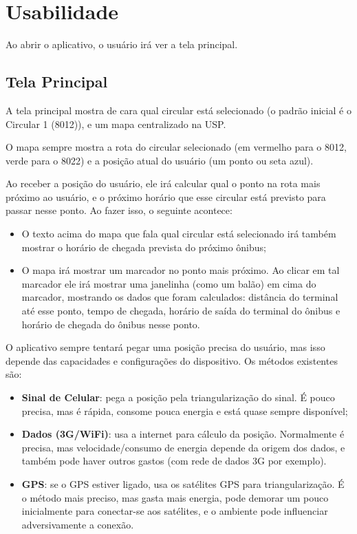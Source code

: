 




\cabecalho

\section{Usabilidade}
Ao abrir o aplicativo, o usuário irá ver a tela principal. 

\subsection{Tela Principal}
A tela principal mostra de cara qual circular está selecionado (o padrão inicial é o Circular 1 (8012)),
e um mapa centralizado na USP.

O mapa sempre mostra a rota do circular selecionado (em vermelho para o 8012, verde para o 8022) e a posição
atual do usuário (um ponto ou seta azul).

Ao receber a posição do usuário, ele irá calcular qual o ponto na rota mais próximo ao usuário, e o próximo horário
que esse circular está previsto para passar nesse ponto. Ao fazer isso, o seguinte acontece:
\begin{itemize}
    \item O texto acima do mapa que fala qual circular está selecionado
        irá também mostrar o horário de chegada prevista do próximo ônibus;
    \item O mapa irá mostrar um marcador no ponto mais próximo. Ao clicar em tal marcador ele irá mostrar
        uma janelinha (como um balão) em cima do marcador, mostrando os dados que foram calculados: distância
        do terminal até esse ponto, tempo de chegada, horário de saída do terminal do ônibus e horário de chegada
        do ônibus nesse ponto.
\end{itemize}

O aplicativo sempre tentará pegar uma posição precisa do usuário, mas isso depende das capacidades e configurações
do dispositivo. Os métodos existentes são:
\begin{itemize}
    \item \textbf{Sinal de Celular}: pega a posição pela triangularização do sinal. É pouco precisa, mas é rápida,
        consome pouca energia e está quase sempre disponível;
    \item \textbf{Dados (3G/WiFi)}: usa a internet para cálculo da posição. Normalmente é precisa, mas velocidade/consumo
        de energia depende da origem dos dados, e também pode haver outros gastos (com rede de dados 3G por exemplo).
    \item \textbf{GPS}: se o GPS estiver ligado, usa os satélites GPS para triangularização. É o método mais preciso,
        mas gasta mais energia, pode demorar um pouco inicialmente para conectar-se aos satélites, e o ambiente
        pode influenciar adversivamente a conexão.
\end{itemize}

